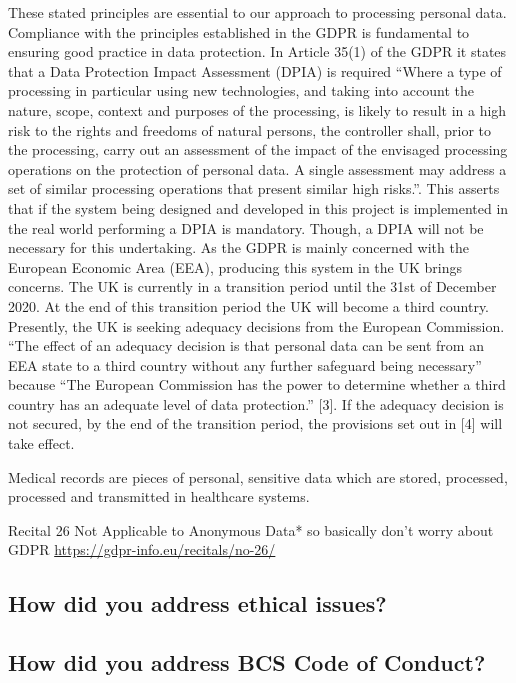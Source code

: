  These stated principles are essential to our approach to
 processing personal data. Compliance with the principles
 established in the GDPR is fundamental to ensuring good
 practice in data protection.
 In Article 35(1) of the GDPR it states that a Data Protection
 Impact Assessment (DPIA) is required “Where a type of
 processing in particular using new technologies, and taking
 into account the nature, scope, context and purposes of the
 processing, is likely to result in a high risk to the rights and
 freedoms of natural persons, the controller shall, prior to the
 processing, carry out an assessment of the impact of the
 envisaged processing operations on the protection of personal
 data. A single assessment may address a set of similar
 processing operations that present similar high risks.”. This
 asserts that if the system being designed and developed in this
 project is implemented in the real world performing a DPIA is
 mandatory. Though, a DPIA will not be necessary for this
 undertaking.
 As the GDPR is mainly concerned with the European
 Economic Area (EEA), producing this system in the UK
 brings concerns. The UK is currently in a transition period
 until the 31st of December 2020. At the end of this transition
 period the UK will become a third country. Presently, the UK
 is seeking adequacy decisions from the European
 Commission. “The effect of an adequacy decision is that
 personal data can be sent from an EEA state to a third country
 without any further safeguard being necessary” because “The
 European Commission has the power to determine whether a
 third country has an adequate level of data protection.” [3]. If
 the adequacy decision is not secured, by the end of the
 transition period, the provisions set out in [4] will take effect.
 
 Medical records are pieces of personal, sensitive data which are stored, processed, processed and transmitted in healthcare systems. %
 
 Recital 26 Not Applicable to Anonymous Data* so basically don't worry about GDPR  \url{https://gdpr-info.eu/recitals/no-26/}
 
 \subsection{How did you address ethical issues?}
 
 \subsection{How did you address BCS Code of Conduct?} 
 
